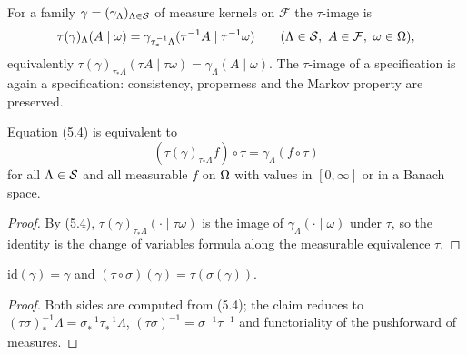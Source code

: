 \begin{definition}
    \label{def:trans-spec-map}
    \leanok

    For a family $\gamma = (\gamma_\Lambda)_{\Lambda \in \mathcal{S}}$ of measure kernels on
    $\mathcal{F}$ the $\tau$-image is
    \[\tau(\gamma)_\Lambda(A \mid \omega) = \gamma_{\tau_*^{-1}\Lambda}(\tau^{-1}A \mid
      \tau^{-1}\omega) \qquad (\Lambda \in \Fin,\ A \in \mathcal{F},\ \omega \in \Cfg),\]
    equivalently $\tau(\gamma)_{\tau_*\Lambda}(\tau A \mid \tau\omega) =
    \gamma_\Lambda(A \mid \omega)$.  The $\tau$-image of a specification is again a
    specification: consistency, properness and the Markov property are preserved.
\end{definition}

\begin{lemma}[Georgii (5.5)]
    \label{lem:trans-spec-map-integral}
    \leanok

    Equation (5.4) is equivalent to
    \[(\tau(\gamma)_{\tau_*\Lambda} f) \circ \tau = \gamma_\Lambda(f \circ \tau)\]
    for all $\Lambda \in \mathcal{S}$ and all measurable $f$ on $\Omega$ with values in $[0,\infty]$ or
    in a Banach space.
\end{lemma}
\begin{proof}
    \leanok

    By (5.4), $\tau(\gamma)_{\tau_*\Lambda}(\cdot \mid \tau\omega)$ is the image of
    $\gamma_\Lambda(\cdot\mid\omega)$ under $\tau$, so the identity is the change of variables
    formula along the measurable equivalence $\tau$.
\end{proof}

\begin{lemma}
    \label{lem:trans-spec-map-action}
    \leanok

    $\mathrm{id}(\gamma) = \gamma$ and $(\tau \circ \sigma)(\gamma) = \tau(\sigma(\gamma))$.
\end{lemma}
\begin{proof}
    \leanok

    Both sides are computed from (5.4); the claim reduces to
    $(\tau\sigma)_*^{-1}\Lambda = \sigma_*^{-1}\tau_*^{-1}\Lambda$,
    $(\tau\sigma)^{-1} = \sigma^{-1}\tau^{-1}$ and functoriality of the pushforward of measures.
\end{proof}

